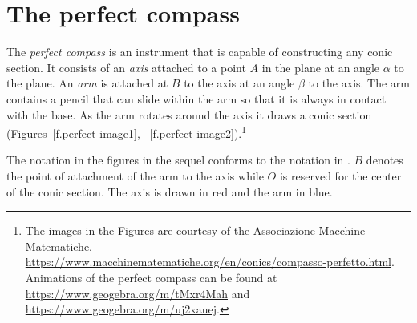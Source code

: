 
\section{The perfect compass}\label{s.perfect}

The \emph{perfect compass} is an instrument that is capable of constructing any conic section. It consists of an \emph{axis} attached to a point $A$ in the plane at an angle $\alpha$ to the plane. An \emph{arm} is attached at $B$ to the axis at an angle $\beta$ to the axis. The arm contains a pencil that can slide within the arm so that it is always in contact with the base. As the arm rotates around the axis it draws a conic section (Figures~\ref{f.perfect-image1}, ~\ref{f.perfect-image2}).\footnote{The images in the Figures are courtesy of the Associazione Macchine Matematiche. \\\hspace*{1.5em} \url{https://www.macchinematematiche.org/en/conics/compasso-perfetto.html}.\\\hspace*{1.5em} Animations of the perfect compass can be found at \url{https://www.geogebra.org/m/tMxr4Mah} and\\\hspace*{1.5em} \url{https://www.geogebra.org/m/uj2xauej}.}

The notation in the figures in the sequel conforms to the notation in \cite{henk}. $B$ denotes the point of attachment of the arm to the axis while $O$ is reserved for the center of the conic section. The axis is drawn in red and the arm in blue.

